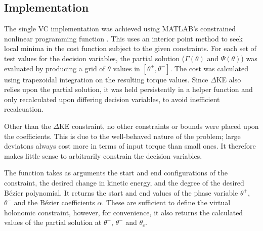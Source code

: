 \subsection{Implementation}
The single VC implementation was achieved using MATLAB's constrained nonlinear programming function . This uses an interior point method to seek local minima in the cost function subject to the given constraints. For each set of test values for the decision variables, the partial solution ($\Gamma(\theta)$ and $\Psi(\theta)$) was evaluated by producing a grid of $\theta$ values in $[\theta^+, \theta^-]$. The cost was calculated using trapezoidal integration on the resulting torque values. Since $\Delta$KE also relies upon the partial solution, it was held persistently in a helper function and only recalculated upon differing decision variables, to avoid inefficient recalcuation.

Other than the $\Delta$KE constraint, no other constraints or bounds were placed upon the coefficients. This is due to the well-behaved nature of the problem; large deviatons always cost more in terms of input torque than small ones. It therefore makes little sense to arbitrarily constrain the decision variables.

The  function takes as arguments the start and end configurations of the constraint, the desired change in kinetic energy, and the degree of the desired Bézier polynomial. It returns the start and end values of the phase variable $\theta^+$, $\theta^-$ and the Bézier coefficients $\alpha$. These are sufficient to define the virtual holonomic constraint, however, for convenience, it also returns the calculated values of the partial solution at $\theta^+$, $\theta^-$ and $\theta_c$.